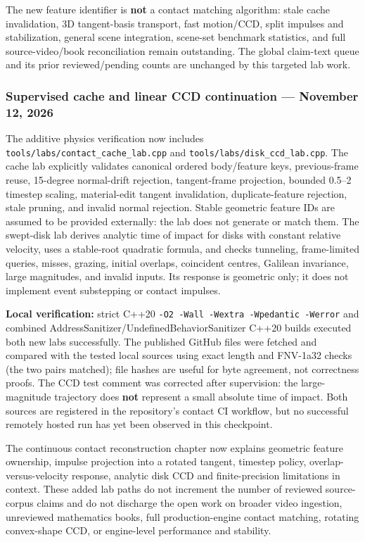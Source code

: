 The new feature identifier is \textbf{not} a contact matching algorithm: stale cache invalidation, 3D tangent-basis transport, fast motion/CCD, split impulses and stabilization, general scene integration, scene-set benchmark statistics, and full source-video/book reconciliation remain outstanding. The global claim-text queue and its prior reviewed/pending counts are unchanged by this targeted lab work.

\subsubsection{Supervised cache and linear CCD continuation --- November 12, 2026}\label{appendix-3b67654799a2-supervised-cache-and-linear-ccd-continuation-november-12-2026}

The additive physics verification now includes \texttt{tools/labs/contact\_cache\_lab.cpp} and \texttt{tools/labs/disk\_ccd\_lab.cpp}. The cache lab explicitly validates canonical ordered body/feature keys, previous-frame reuse, 15-degree normal-drift rejection, tangent-frame projection, bounded 0.5--2 timestep scaling, material-edit tangent invalidation, duplicate-feature rejection, stale pruning, and invalid normal rejection. Stable geometric feature IDs are assumed to be provided externally: the lab does not generate or match them. The swept-disk lab derives analytic time of impact for disks with constant relative velocity, uses a stable-root quadratic formula, and checks tunneling, frame-limited queries, misses, grazing, initial overlaps, coincident centres, Galilean invariance, large magnitudes, and invalid inputs. Its response is geometric only; it does not implement event substepping or contact impulses.

\textbf{Local verification:} strict C++20 \texttt{-O2\ -Wall\ -Wextra\ -Wpedantic\ -Werror} and combined AddressSanitizer/UndefinedBehaviorSanitizer C++20 builds executed both new labs successfully. The published GitHub files were fetched and compared with the tested local sources using exact length and FNV-1a32 checks (the two pairs matched); file hashes are useful for byte agreement, not correctness proofs. The CCD test comment was corrected after supervision: the large-magnitude trajectory does \textbf{not} represent a small absolute time of impact. Both sources are registered in the repository's contact CI workflow, but no successful remotely hosted run has yet been observed in this checkpoint.

The continuous contact reconstruction chapter now explains geometric feature ownership, impulse projection into a rotated tangent, timestep policy, overlap-versus-velocity response, analytic disk CCD and finite-precision limitations in context. These added lab paths do not increment the number of reviewed source-corpus claims and do not discharge the open work on broader video ingestion, unreviewed mathematics books, full production-engine contact matching, rotating convex-shape CCD, or engine-level performance and stability.

